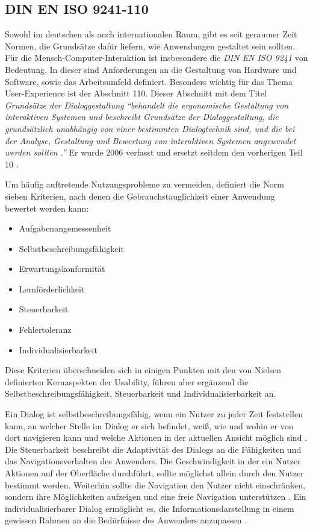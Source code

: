 \subsection{DIN EN ISO 9241-110} \label{sec:uidNorms}
Sowohl im deutschen als auch internationalen Raum, gibt es seit geraumer Zeit Normen, die Grundsätze dafür liefern, wie Anwendungen gestaltet sein sollten. Für die Mensch-Computer-Interaktion ist insbesondere die \textit{DIN EN ISO 9241} von Bedeutung. In dieser sind Anforderungen an die Gestaltung von Hardware und Software, sowie das Arbeitsumfeld definiert. Besonders wichtig für das Thema User-Experience ist der Abschnitt 110. Dieser Abschnitt mit dem Titel \textit{Grundsätze der Dialoggestaltung} \textit{\enquote{behandelt die ergonomische Gestaltung von interaktiven Systemen und beschreibt Grundsätze der Dialoggestaltung, die grundsätzlich unabhängig von einer bestimmten Dialogtechnik sind, und die bei der Analyse, Gestaltung und Bewertung von interaktiven Systemen angewendet werden sollten \cite[S. 4]{DIN2006}.}} Er wurde 2006 verfasst und ersetzt seitdem den vorherigen Teil 10 \cite{DIN2006}.\par
Um häufig auftretende Nutzungsprobleme zu vermeiden, definiert die Norm sieben Kriterien, nach denen die Gebrauchstauglichkeit einer Anwendung bewertet werden kann:
\begin{itemize}
	\item Aufgabenangemessenheit
	\item Selbstbeschreibungsfähigkeit
	\item Erwartungskonformität
	\item Lernförderlichkeit
	\item Steuerbarkeit
	\item Fehlertoleranz
	\item Individualisierbarkeit \cite[S. 7]{DIN2006}
\end{itemize}
Diese Kriterien überschneiden sich in einigen Punkten mit den von Nielsen definierten Kernaspekten der Usability, führen aber ergänzend die Selbstbeschreibungsfähigkeit, Steuerbarkeit und Individualisierbarkeit an.\par
Ein Dialog ist selbstbeschreibungsfähig, wenn ein Nutzer zu jeder Zeit feststellen kann, an welcher Stelle im Dialog er sich befindet, weiß, wie und wohin er von dort navigieren kann und welche Aktionen in der aktuellen Ansicht möglich sind \cite[S. 10]{DIN2006}. Die Steuerbarkeit beschreibt die Adaptivität des Dialogs an die Fähigkeiten und das Navigationsverhalten des Anwenders. Die Geschwindigkeit in der ein Nutzer Aktionen auf der Oberfläche durchführt, sollte möglichst allein durch den Nutzer bestimmt werden. Weiterhin sollte die Navigation den Nutzer nicht einschränken, sondern ihre Möglichkeiten aufzeigen und eine freie Navigation unterstützen \cite[S. 13]{DIN2006}. Ein individualisierbarer Dialog ermöglicht es, die Informationsdarstellung in einem gewissen Rahmen an die Bedürfnisse des Anwenders anzupassen \cite[S. 15]{DIN2006}. \par
